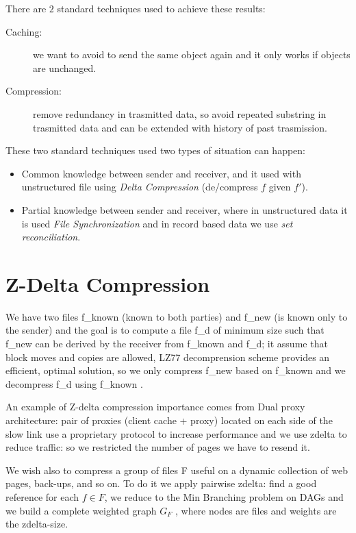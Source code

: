 There are $2$ standard techniques used to achieve these results:
\begin{description}
	\item [Caching: ] we want to avoid to send the same object again and it only works 
			  if objects are unchanged.

	\item [Compression: ] remove redundancy in trasmitted data, so avoid repeated substring in
	                      trasmitted data and can be extended with history of past trasmission.

\end{description}
These two standard techniques used two types of situation can happen:
\begin{itemize}
	\item Common knowledge between sender and receiver, and it used with unstructured file 
	      using \emph{Delta Compression} (de/compress $f$ given $f'$).
	\item Partial knowledge between sender and receiver, where in unstructured data it is used
	      \emph{File Synchronization} and in record based data we use \emph{set reconciliation}.
\end{itemize}

\section{Z-Delta Compression}
We have two files f\_known (known to both parties) and f\_new (is known only to the sender) and
the goal is to compute a file f\_d of minimum size such that f\_new can be derived by the receiver
from f\_known and f\_d; it assume that block moves and copies are allowed, LZ77 decomprension
scheme provides an efficient, optimal solution, so we only compress f\_new based on f\_known
and we decompress f\_d using f\_known .

An example of Z-delta compression importance comes from Dual proxy architecture:
pair of proxies (client cache + proxy) located on each side of the slow link use a 
proprietary protocol to increase performance and we use zdelta to reduce traffic:
so we restricted the number of pages we have to resend it.

We wish also to compress a group of files F useful on a dynamic collection of web pages, 
back-ups, and so on.\newline
To do it we apply pairwise zdelta: find a good reference for each $f \in F$, we reduce
to the Min Branching problem on DAGs and we build a complete weighted graph $G_F$ ,
where nodes are files and weights are the zdelta-size.

